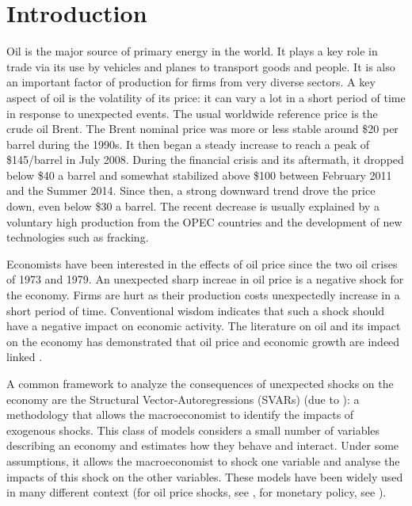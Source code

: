 \documentclass[11pt,a4paper]{article}
\begin{document}
\clearpage
	
	\setcounter{page}{1}

\section{Introduction} %

Oil is the major source of primary energy in the world. It plays a key role in trade  via its use by vehicles and planes to transport goods and people.  
It is also an important factor of production for firms from very diverse sectors. 
A key aspect of oil  is the volatility of its price: it can vary a lot in a short period of time in response to unexpected events. The usual worldwide reference price is the crude oil Brent. The Brent nominal price was more or less stable around \$20 per barrel during the 1990s. It then began a steady increase to reach a peak of \$145/barrel in July 2008. During the financial crisis and its aftermath, it dropped below \$40 a barrel and somewhat stabilized above \$100 between February 2011 and the Summer 2014. Since then,  a strong downward trend drove the price down, even below \$30 a barrel. The recent decrease is usually explained by a voluntary high production  from the OPEC countries and the development of new technologies such as fracking. 


Economists have been interested in the effects of oil price  since the two oil crises of 1973 and 1979. An unexpected sharp increae in oil price is a negative shock for the economy. Firms are hurt as their production costs unexpectedly increase in a short period of time. 
Conventional wisdom indicates that such a shock should have a negative impact on economic activity. 
The literature on oil and its impact on the economy has demonstrated that oil price and economic growth are indeed linked \citep{hamilton1983oil, hamilton2003oil, hamilton2011historical}.

A common framework to analyze the consequences of unexpected shocks on the economy are the Structural Vector-Autoregressions (SVARs) (due to \citealp{sims1980macroeconomics}): a methodology that allows the macroeconomist to identify the impacts of exogenous shocks. 
This class of models considers a small number of variables describing an economy and estimates how they behave and interact. 
Under some assumptions, it allows the macroeconomist to shock one variable and analyse the impacts of this shock on the other variables.
These models have been widely used in many different context (for oil price shocks, see \citealp[chp. 7]{gali2010international}, for monetary policy, see \citealp{christiano1999monetary}).
\end{document}
